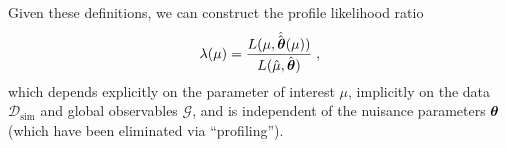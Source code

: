 \documentclass{cernrep}
\def\vec#1{\ifmmode
\mathchoice{\mbox{\boldmath$\displaystyle\bf#1$}}
{\mbox{\boldmath$\textstyle\bf#1$}}
{\mbox{\boldmath$\scriptstyle\bf#1$}}
{\mbox{\boldmath$\scriptscriptstyle\bf#1$}}\else
{\mbox{\boldmath$\bf#1$}}\fi}
\newcommand{\datasim}{{\ensuremath{\mathcal{D}_{\textrm{sim}}}}}
\newcommand{\globs}{{\ensuremath{\mathcal{G}}}}
\begin{document}
Given these definitions, we can construct the profile likelihood ratio
\begin{equation}
\label{eq:lambdatilde}  
{\lambda}({\mu}) =  \frac{ L(\mu, \hat{\hat{\vec{\theta}}}(\mu)) }
{L(\hat{\mu}, \hat{\vec{\theta}}) } \;,
\end{equation}
which depends explicitly on the parameter of interest $\mu$, implicitly on the data $\datasim$ and global observables $\globs$, and is independent of the nuisance parameters $\vec\theta$ (which have been eliminated via ``profiling'').


      
\begin{figure}[h]
\begin{center}
\\

\end{center}
\end{figure}
\end{document}
